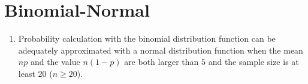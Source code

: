 \section{Binomial-Normal}

\begin{enumerate}
    \item Probability calculation with the binomial distribution function can be adequately approximated with a normal distribution function when the mean $np$ and the value $n (1 - p)$ are both larger than $5$ and the sample size is at least $20$ ($n \geq 20$). 
    \hfill \cite{statistics/book/Statistics-for-Data-Scientists/Maurits-Kaptein}
\end{enumerate}






